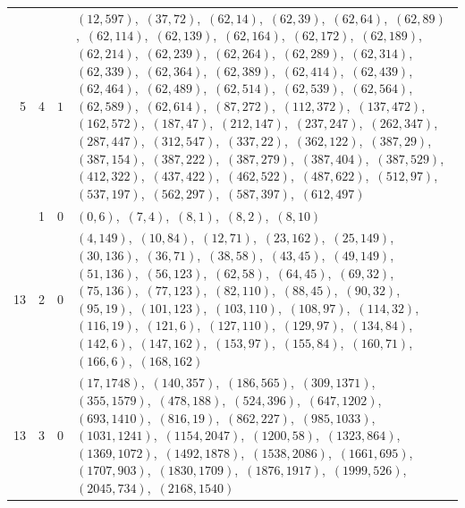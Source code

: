 \documentclass[11pt]{article}
\begin{document}
\begin{longtable}{@{}rrl>{\raggedright\arraybackslash}p{}@{}}
5 & 4 & $1$ & $(12,597)$,\allowbreak\ $(37,72)$,\allowbreak\ $(62,14)$,\allowbreak\ $(62,39)$,\allowbreak\ $(62,64)$,\allowbreak\ $(62,89)$,\allowbreak\ $(62,114)$,\allowbreak\ $(62,139)$,\allowbreak\ $(62,164)$,\allowbreak\ $(62,172)$,\allowbreak\ $(62,189)$,\allowbreak\ $(62,214)$,\allowbreak\ $(62,239)$,\allowbreak\ $(62,264)$,\allowbreak\ $(62,289)$,\allowbreak\ $(62,314)$,\allowbreak\ $(62,339)$,\allowbreak\ $(62,364)$,\allowbreak\ $(62,389)$,\allowbreak\ $(62,414)$,\allowbreak\ $(62,439)$,\allowbreak\ $(62,464)$,\allowbreak\ $(62,489)$,\allowbreak\ $(62,514)$,\allowbreak\ $(62,539)$,\allowbreak\ $(62,564)$,\allowbreak\ $(62,589)$,\allowbreak\ $(62,614)$,\allowbreak\ $(87,272)$,\allowbreak\ $(112,372)$,\allowbreak\ $(137,472)$,\allowbreak\ $(162,572)$,\allowbreak\ $(187,47)$,\allowbreak\ $(212,147)$,\allowbreak\ $(237,247)$,\allowbreak\ $(262,347)$,\allowbreak\ $(287,447)$,\allowbreak\ $(312,547)$,\allowbreak\ $(337,22)$,\allowbreak\ $(362,122)$,\allowbreak\ $(387,29)$,\allowbreak\ $(387,154)$,\allowbreak\ $(387,222)$,\allowbreak\ $(387,279)$,\allowbreak\ $(387,404)$,\allowbreak\ $(387,529)$,\allowbreak\ $(412,322)$,\allowbreak\ $(437,422)$,\allowbreak\ $(462,522)$,\allowbreak\ $(487,622)$,\allowbreak\ $(512,97)$,\allowbreak\ $(537,197)$,\allowbreak\ $(562,297)$,\allowbreak\ $(587,397)$,\allowbreak\ $(612,497)$\\
\addlinespace[3pt]
13 & 1 & $0$ & $(0,6)$,\allowbreak\ $(7,4)$,\allowbreak\ $(8,1)$,\allowbreak\ $(8,2)$,\allowbreak\ $(8,10)$\\
13 & 2 & $0$ & $(4,149)$,\allowbreak\ $(10,84)$,\allowbreak\ $(12,71)$,\allowbreak\ $(23,162)$,\allowbreak\ $(25,149)$,\allowbreak\ $(30,136)$,\allowbreak\ $(36,71)$,\allowbreak\ $(38,58)$,\allowbreak\ $(43,45)$,\allowbreak\ $(49,149)$,\allowbreak\ $(51,136)$,\allowbreak\ $(56,123)$,\allowbreak\ $(62,58)$,\allowbreak\ $(64,45)$,\allowbreak\ $(69,32)$,\allowbreak\ $(75,136)$,\allowbreak\ $(77,123)$,\allowbreak\ $(82,110)$,\allowbreak\ $(88,45)$,\allowbreak\ $(90,32)$,\allowbreak\ $(95,19)$,\allowbreak\ $(101,123)$,\allowbreak\ $(103,110)$,\allowbreak\ $(108,97)$,\allowbreak\ $(114,32)$,\allowbreak\ $(116,19)$,\allowbreak\ $(121,6)$,\allowbreak\ $(127,110)$,\allowbreak\ $(129,97)$,\allowbreak\ $(134,84)$,\allowbreak\ $(142,6)$,\allowbreak\ $(147,162)$,\allowbreak\ $(153,97)$,\allowbreak\ $(155,84)$,\allowbreak\ $(160,71)$,\allowbreak\ $(166,6)$,\allowbreak\ $(168,162)$\\
13 & 3 & $0$ & $(17,1748)$,\allowbreak\ $(140,357)$,\allowbreak\ $(186,565)$,\allowbreak\ $(309,1371)$,\allowbreak\ $(355,1579)$,\allowbreak\ $(478,188)$,\allowbreak\ $(524,396)$,\allowbreak\ $(647,1202)$,\allowbreak\ $(693,1410)$,\allowbreak\ $(816,19)$,\allowbreak\ $(862,227)$,\allowbreak\ $(985,1033)$,\allowbreak\ $(1031,1241)$,\allowbreak\ $(1154,2047)$,\allowbreak\ $(1200,58)$,\allowbreak\ $(1323,864)$,\allowbreak\ $(1369,1072)$,\allowbreak\ $(1492,1878)$,\allowbreak\ $(1538,2086)$,\allowbreak\ $(1661,695)$,\allowbreak\ $(1707,903)$,\allowbreak\ $(1830,1709)$,\allowbreak\ $(1876,1917)$,\allowbreak\ $(1999,526)$,\allowbreak\ $(2045,734)$,\allowbreak\ $(2168,1540)$\\

\end{longtable}
\end{document}
